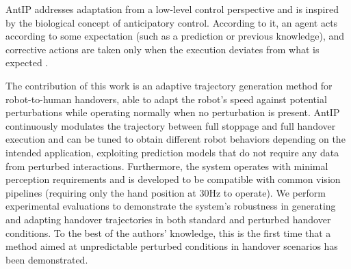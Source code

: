 \documentclass[lettersize,journal]{IEEEtran}
\begin{document}
AntIP addresses adaptation from a low-level control perspective and is inspired by the biological concept of anticipatory control.
According to it, an agent acts according to some expectation (such as a prediction or previous knowledge), and corrective actions are taken only when the execution deviates from what is expected \cite{hoffmann_anticipatory_2004}.

The contribution of this work is an adaptive trajectory generation method for robot-to-human handovers, able to adapt the robot's speed against potential perturbations while operating normally when no perturbation is present.
AntIP continuously modulates the trajectory between full stoppage and full handover execution and can be tuned to obtain different robot behaviors depending on the intended application, exploiting prediction models that do not require any data from perturbed interactions.
Furthermore, the system operates with minimal perception requirements and is developed to be compatible with common vision pipelines (requiring only the hand position at 30Hz to operate).
We perform experimental evaluations to demonstrate the system's robustness in generating and adapting handover trajectories in both standard and perturbed handover conditions.
To the best of the authors' knowledge, this is the first time that a method aimed at unpredictable perturbed conditions in handover scenarios has been demonstrated.
\end{document}
